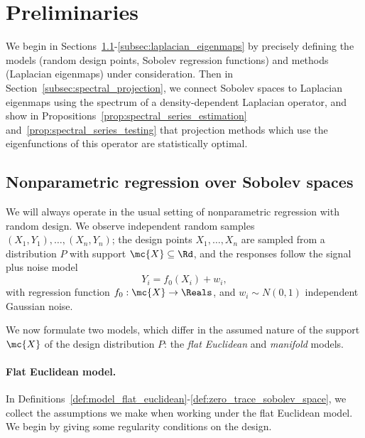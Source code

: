 \section{Preliminaries}
\label{sec:setup_main_results}

We begin in Sections~\ref{subsec:regression_laplacian_eigenmaps}-\ref{subsec:laplacian_eigenmaps} by precisely defining the models (random design points, Sobolev regression functions) and methods (Laplacian eigenmaps) under consideration. Then in Section~\ref{subsec:spectral_projection}, we connect Sobolev spaces to Laplacian eigenmaps using the spectrum of a density-dependent Laplacian operator, and show in Propositions~\ref{prop:spectral_series_estimation} and~\ref{prop:spectral_series_testing} that projection methods which use the eigenfunctions of this operator are statistically optimal.

\subsection{Nonparametric regression over Sobolev spaces}
\label{subsec:regression_laplacian_eigenmaps}

We will always operate in the usual setting of nonparametric regression with random design. We observe independent random samples $(X_1,Y_1),\ldots,(X_n,Y_n)$; the design points $X_1,\ldots,X_n$ are sampled from a distribution $P$ with support $\mc{X} \subseteq \Rd$, and the responses follow the signal plus noise model
\begin{equation}
\label{eqn:model}
Y_i = f_0(X_i) + w_i,
\end{equation}
with regression function $f_0: \mc{X} \to \Reals$, and $w_i \sim N(0,1)$ independent Gaussian noise.

We now formulate two models, which differ in the assumed nature of the support $\mc{X}$ of the design distribution $P$: the \emph{flat Euclidean} and \emph{manifold} models.

\paragraph{Flat Euclidean model.}
In Definitions~\ref{def:model_flat_euclidean}-\ref{def:zero_trace_sobolev_space}, we collect the assumptions we make when working under the flat Euclidean model. We begin by giving some regularity conditions on the design.

